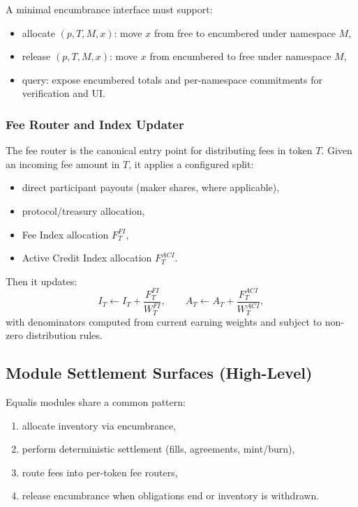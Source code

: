 \documentclass[version=preprint]{iacrcc}
\begin{document}
A minimal encumbrance interface must support:
\begin{itemize}
  \item allocate $(p, T, M, x)$: move $x$ from free to encumbered under namespace $M$,
  \item release $(p, T, M, x)$: move $x$ from encumbered to free under namespace $M$,
  \item query: expose encumbered totals and per-namespace commitments for verification and UI.
\end{itemize}

\subsubsection{Fee Router and Index Updater}

The fee router is the canonical entry point for distributing fees in token $T$. Given an incoming fee amount in $T$, it applies a configured split:
\begin{itemize}
  \item direct participant payouts (maker shares, where applicable),
  \item protocol/treasury allocation,
  \item Fee Index allocation $F^{FI}_T$,
  \item Active Credit Index allocation $F^{ACI}_T$.
\end{itemize}

Then it updates:
\[
I_T \leftarrow I_T + \frac{F^{FI}_T}{W^{FI}_T},
\qquad
A_T \leftarrow A_T + \frac{F^{ACI}_T}{W^{ACI}_T},
\]
with denominators computed from current earning weights and subject to non-zero distribution rules.

\subsection{Module Settlement Surfaces (High-Level)}

Equalis modules share a common pattern:
\begin{enumerate}
  \item allocate inventory via encumbrance,
  \item perform deterministic settlement (fills, agreements, mint/burn),
  \item route fees into per-token fee routers,
  \item release encumbrance when obligations end or inventory is withdrawn.
\end{enumerate}
\end{document}
